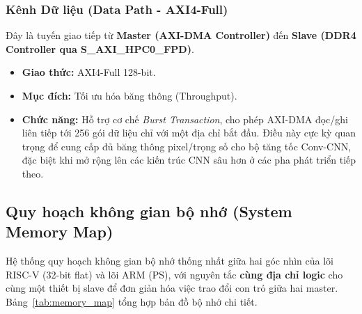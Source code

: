 \subsubsection{Kênh Dữ liệu (Data Path - AXI4-Full)}
Đây là tuyến giao tiếp từ \textbf{Master (AXI-DMA Controller)} đến \textbf{Slave (DDR4 Controller qua S\_AXI\_HPC0\_FPD)}.
\begin{itemize}
    \item \textbf{Giao thức:} AXI4-Full 128-bit.
    \item \textbf{Mục đích:} Tối ưu hóa băng thông (Throughput).
    \item \textbf{Chức năng:} Hỗ trợ cơ chế \textit{Burst Transaction}, cho phép AXI-DMA đọc/ghi liên tiếp tới 256 gói dữ liệu chỉ với một địa chỉ bắt đầu. Điều này cực kỳ quan trọng để cung cấp đủ băng thông pixel/trọng số cho bộ tăng tốc Conv-CNN, đặc biệt khi mở rộng lên các kiến trúc CNN sâu hơn ở các pha phát triển tiếp theo.
\end{itemize}

\subsection{Quy hoạch không gian bộ nhớ (System Memory Map)}
\label{sec:memory_map}
Hệ thống quy hoạch không gian bộ nhớ thống nhất giữa hai góc nhìn của lõi RISC-V (32-bit flat) và lõi ARM (PS), với nguyên tắc \textbf{cùng địa chỉ logic} cho cùng một thiết bị slave để đơn giản hóa việc trao đổi con trỏ giữa hai master. Bảng~\ref{tab:memory_map} tổng hợp bản đồ bộ nhớ chi tiết.

